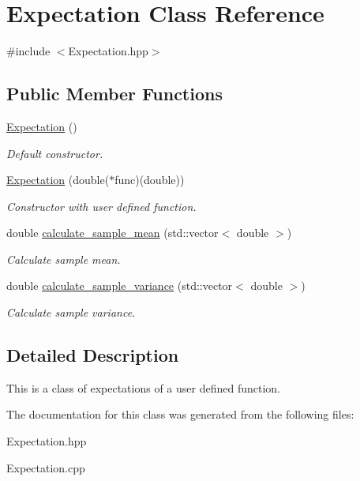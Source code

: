 \hypertarget{classExpectation}{}\section{Expectation Class Reference}
\label{classExpectation}


{\ttfamily \#include $<$Expectation.\+hpp$>$}

\subsection*{Public Member Functions}
\begin{DoxyCompactItemize}
\item 
\mbox{\label{classExpectation_ab0567960d034da8603372199997608ea}} 
\hyperlink{classExpectation_ab0567960d034da8603372199997608ea}{Expectation} ()
\begin{DoxyCompactList}\small\item\em Default constructor. \end{DoxyCompactList}\item 
\mbox{\label{classExpectation_a784765be8934e34c885eb17f655e641c}} 
\hyperlink{classExpectation_a784765be8934e34c885eb17f655e641c}{Expectation} (double($\ast$func)(double))
\begin{DoxyCompactList}\small\item\em Constructor with user defined function. \end{DoxyCompactList}\item 
\mbox{\label{classExpectation_a6d5f9c7255fa14beb2d8150655322c04}} 
double \hyperlink{classExpectation_a6d5f9c7255fa14beb2d8150655322c04}{calculate\+\_\+sample\+\_\+mean} (std\+::vector$<$ double $>$)
\begin{DoxyCompactList}\small\item\em Calculate sample mean. \end{DoxyCompactList}\item 
\mbox{\label{classExpectation_ac26c233b634bfefe2669a7dfb17cbdf4}} 
double \hyperlink{classExpectation_ac26c233b634bfefe2669a7dfb17cbdf4}{calculate\+\_\+sample\+\_\+variance} (std\+::vector$<$ double $>$)
\begin{DoxyCompactList}\small\item\em Calculate sample variance. \end{DoxyCompactList}\end{DoxyCompactItemize}


\subsection{Detailed Description}
This is a class of expectations of a user defined function. 

The documentation for this class was generated from the following files\+:\begin{DoxyCompactItemize}
\item 
Expectation.\+hpp\item 
Expectation.\+cpp\end{DoxyCompactItemize}
